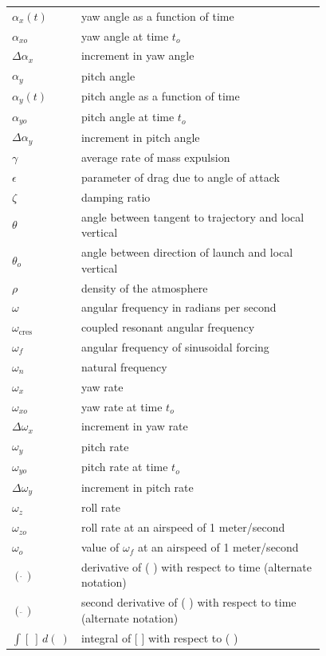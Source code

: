 \begin{longtable}{@{}l p{0.78\linewidth}@{}}
$\alpha_x(t)$ & yaw angle as a function of time \\
$\alpha_{xo}$ & yaw angle at time $t_o$ \\
$\Delta\alpha_x$ & increment in yaw angle \\
$\alpha_y$ & pitch angle \\
$\alpha_y(t)$ & pitch angle as a function of time \\
$\alpha_{yo}$ & pitch angle at time $t_o$ \\
$\Delta\alpha_y$ & increment in pitch angle \\
$\gamma$ & average rate of mass expulsion \\
$\epsilon$ & parameter of drag due to angle of attack \\
$\zeta$ & damping ratio \\
$\theta$ & angle between tangent to trajectory and local vertical \\
$\theta_o$ & angle between direction of launch and local vertical \\
$\rho$ & density of the atmosphere \\
$\omega$ & angular frequency in radians per second \\
$\omega_{\mathrm{cres}}$ & coupled resonant angular frequency \\
$\omega_f$ & angular frequency of sinusoidal forcing \\
$\omega_n$ & natural frequency \\
$\omega_x$ & yaw rate \\
$\omega_{xo}$ & yaw rate at time $t_o$ \\
$\Delta\omega_x$ & increment in yaw rate \\
$\omega_y$ & pitch rate \\
$\omega_{yo}$ & pitch rate at time $t_o$ \\
$\Delta\omega_y$ & increment in pitch rate \\
$\omega_z$ & roll rate \\
$\omega_{zo}$ & roll rate at an airspeed of 1 meter/second \\
$\omega_o$ & value of $\omega_f$ at an airspeed of 1 meter/second \\
$(\dot{\ })$ & derivative of ( ) with respect to time (alternate notation) \\
$(\ddot{\ })$ & second derivative of ( ) with respect to time (alternate notation) \\
$\int [\ ]\, d(\ )$ & integral of [ ] with respect to ( ) \\
\end{longtable}
\addtocounter{table}{-1}%
